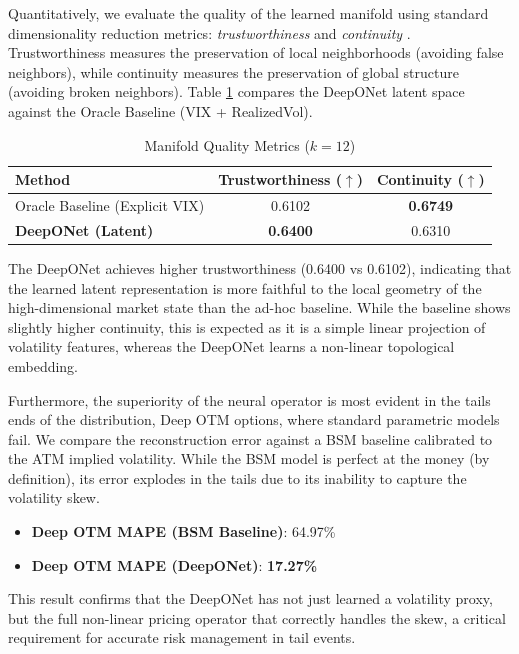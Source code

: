 \documentclass{article}
\begin{document}
Quantitatively, we evaluate the quality of the learned manifold using standard dimensionality reduction metrics: \emph{trustworthiness} and \emph{continuity} \citep{venna2001neighborhood}. Trustworthiness measures the preservation of local neighborhoods (avoiding false neighbors), while continuity measures the preservation of global structure (avoiding broken neighbors). Table \ref{tab:clustering} compares the DeepONet latent space against the Oracle Baseline (VIX + RealizedVol).

\begin{table}[h]
    \centering
    \caption{Manifold Quality Metrics ($k=12$)}
    \label{tab:clustering}
    \begin{tabular}{lcc}
        \toprule
        \textbf{Method} & \textbf{Trustworthiness} ($\uparrow$) & \textbf{Continuity} ($\uparrow$) \\
        \midrule
        Oracle Baseline (Explicit VIX) & 0.6102 & \textbf{0.6749} \\
        \textbf{DeepONet (Latent)} & \textbf{0.6400} & 0.6310 \\
        \bottomrule
    \end{tabular}
\end{table}

The DeepONet achieves higher trustworthiness (0.6400 vs 0.6102), indicating that the learned latent representation is more faithful to the local geometry of the high-dimensional market state than the ad-hoc baseline. While the baseline shows slightly higher continuity, this is expected as it is a simple linear projection of volatility features, whereas the DeepONet learns a non-linear topological embedding.

Furthermore, the superiority of the neural operator is most evident in the tails ends of the distribution, Deep OTM options, where standard parametric models fail. We compare the reconstruction error against a BSM baseline calibrated to the ATM implied volatility. While the BSM model is perfect at the money (by definition), its error explodes in the tails due to its inability to capture the volatility skew.

\begin{itemize}
    \item \textbf{Deep OTM MAPE (BSM Baseline)}: 64.97\%
    \item \textbf{Deep OTM MAPE (DeepONet)}: \textbf{17.27\%}
\end{itemize}

This result confirms that the DeepONet has not just learned a volatility proxy, but the full non-linear pricing operator that correctly handles the skew, a critical requirement for accurate risk management in tail events.
\end{document}
